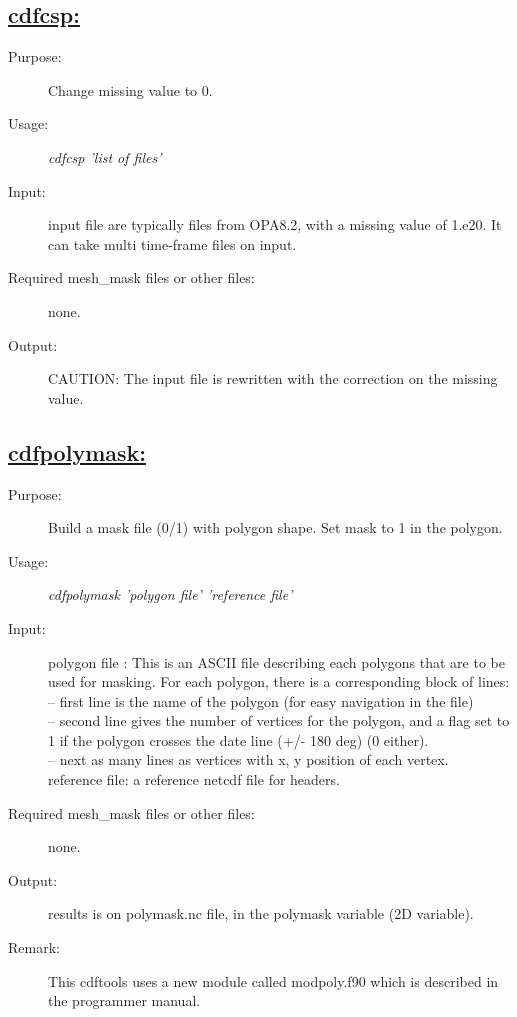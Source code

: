 \documentclass[a4paper,11pt]{article}
\begin{document}
\subsection*{\underline{cdfcsp:}}
\begin{description}
\item[Purpose:]  Change missing value to 0.
\item[Usage:] {\em cdfcsp 'list of files' }
\item[Input:]  input file are typically files from OPA8.2, with a missing value of 1.e20. It can take multi time-frame files on input.
\item[Required mesh\_mask files or other files:] none.
\item[Output:] CAUTION: The input file is rewritten with the correction on the missing value.
\end{description}

\newpage

\subsection*{\underline{cdfpolymask:}}
\begin{description}
\item[Purpose:]  Build a mask file (0/1) with polygon shape. Set mask to 1 in the polygon.
\item[Usage:] {\em cdfpolymask 'polygon file' 'reference file'  }
\item[Input:]  polygon file : This is an ASCII file describing each polygons that are to be used for masking. For each polygon, there
is a corresponding block of lines: \\
      -- first line is the name of the polygon (for easy navigation in the file) \\
      -- second line gives the number of vertices for the polygon, and a flag set to 1 if the polygon crosses the date line (+/- 180 deg) (0 either). \\
      -- next as many lines as vertices with x, y position of each vertex. \\
         reference file: a reference netcdf file for headers.
\item[Required mesh\_mask files or other files:] none.
\item[Output:] results is on polymask.nc file, in the polymask variable (2D variable).
\item[Remark:] This cdftools uses a new module called modpoly.f90 which is described in the programmer manual.
\end{description}
\end{document}
